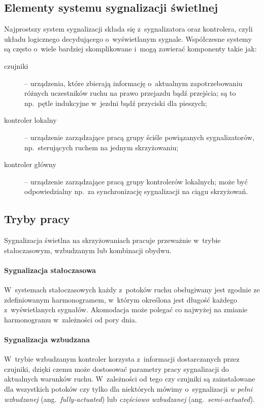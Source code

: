\documentclass{pracamgr}
\newcommand{\ang}[1]{(ang.~\emph{#1})}
\theoremstyle{plain}
\begin{document}
\subsection{Elementy systemu sygnalizacji świetlnej}
\label{ss:elementy} Najprostszy system sygnalizacji składa się
z~sygnalizatora oraz kontrolera, czyli układu logicznego decydującego
o~wyświetlanym sygnale. Współczesne systemy są często o~wiele bardziej
skomplikowane i~mogą zawierać komponenty takie jak:
\begin{description}
  \item[czujniki] -- urządzenia, które zbierają informację o~aktualnym
  zapotrzebowaniu różnych uczestników ruchu na prawo przejazdu bądź
  przejścia; są to np.~pętle indukcyjne w~jezdni bądź
  przyciski dla pieszych;
  \item[kontroler lokalny] -- urządzenie zarządzające pracą grupy
  ściśle powiązanych sygnalizatorów, np.~sterujących ruchem na jednym
  skrzyżowaniu;
  \item[kontroler główny] -- urządzenie zarządzające pracą grupy
  kontrolerów lokalnych; może być odpowiedzialny np.~za synchronizację
  sygnalizacji na ciągu skrzyżowań.
\end{description}

\subsection{Tryby pracy}
\label{ss:tryby} Sygnalizacja świetlna na skrzyżowaniach pracuje
przeważnie w~trybie stałoczasowym, wzbudzanym lub kombinacji obydwu.

\paragraph{Sygnalizacja stałoczasowa} W~systemach stałoczasowych każdy
z~potoków ruchu obsługiwany jest zgodnie ze zdefiniowanym
harmonogramem, w~którym określona jest długość każdego z~wyświetlanych
sygnałów. Akomodacja może polegać co najwyżej na zmianie harmonogramu
w~zależności od pory dnia.

\paragraph{Sygnalizacja wzbudzana}
W~trybie wzbudzanym kontroler korzysta z~informacji dostarczanych
przez czujniki, dzięki czemu może dostosować parametry pracy
sygnalizacji do aktualnych warunków ruchu. W~zależności od tego czy
czujniki są zainstalowane dla wszystkich potoków czy tylko dla
niektórych mówimy o~sygnalizacji \emph{w pełni wzbudzanej}
\ang{fully-actuated} lub \emph{częściowo wzbudzanej}
\ang{semi-actuated}.
\end{document}
